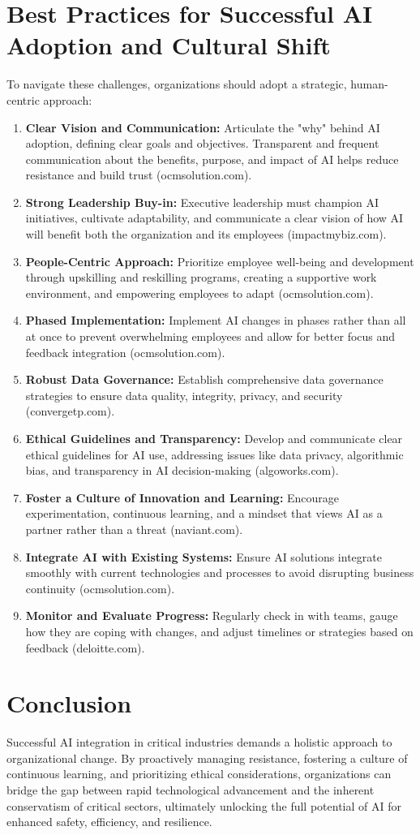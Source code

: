 \section{Best Practices for Successful AI Adoption and Cultural Shift}
To navigate these challenges, organizations should adopt a strategic, human-centric approach:
\begin{enumerate}
    \item \textbf{Clear Vision and Communication:} Articulate the "why" behind AI adoption, defining clear goals and objectives. Transparent and frequent communication about the benefits, purpose, and impact of AI helps reduce resistance and build trust (ocmsolution.com).
    \item \textbf{Strong Leadership Buy-in:} Executive leadership must champion AI initiatives, cultivate adaptability, and communicate a clear vision of how AI will benefit both the organization and its employees (impactmybiz.com).
    \item \textbf{People-Centric Approach:} Prioritize employee well-being and development through upskilling and reskilling programs, creating a supportive work environment, and empowering employees to adapt (ocmsolution.com).
    \item \textbf{Phased Implementation:} Implement AI changes in phases rather than all at once to prevent overwhelming employees and allow for better focus and feedback integration (ocmsolution.com).
    \item \textbf{Robust Data Governance:} Establish comprehensive data governance strategies to ensure data quality, integrity, privacy, and security (convergetp.com).
    \item \textbf{Ethical Guidelines and Transparency:} Develop and communicate clear ethical guidelines for AI use, addressing issues like data privacy, algorithmic bias, and transparency in AI decision-making (algoworks.com).
    \item \textbf{Foster a Culture of Innovation and Learning:} Encourage experimentation, continuous learning, and a mindset that views AI as a partner rather than a threat (naviant.com).
    \item \textbf{Integrate AI with Existing Systems:} Ensure AI solutions integrate smoothly with current technologies and processes to avoid disrupting business continuity (ocmsolution.com).
    \item \textbf{Monitor and Evaluate Progress:} Regularly check in with teams, gauge how they are coping with changes, and adjust timelines or strategies based on feedback (deloitte.com).
\end{enumerate}

\section{Conclusion}
Successful AI integration in critical industries demands a holistic approach to organizational change. By proactively managing resistance, fostering a culture of continuous learning, and prioritizing ethical considerations, organizations can bridge the gap between rapid technological advancement and the inherent conservatism of critical sectors, ultimately unlocking the full potential of AI for enhanced safety, efficiency, and resilience.
